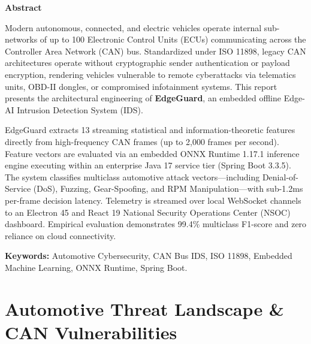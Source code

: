 \documentclass[12pt,a4paper]{report}
\begin{document}
\begin{center}
    {\Large \textbf{Abstract}}
\end{center}
\vspace{0.5cm}

Modern autonomous, connected, and electric vehicles operate internal sub-networks of up to 100 Electronic Control Units (ECUs) communicating across the Controller Area Network (CAN) bus. Standardized under ISO 11898, legacy CAN architectures operate without cryptographic sender authentication or payload encryption, rendering vehicles vulnerable to remote cyberattacks via telematics units, OBD-II dongles, or compromised infotainment systems. This report presents the architectural engineering of \textbf{EdgeGuard}, an embedded offline Edge-AI Intrusion Detection System (IDS).

EdgeGuard extracts 13 streaming statistical and information-theoretic features directly from high-frequency CAN frames (up to 2,000 frames per second). Feature vectors are evaluated via an embedded ONNX Runtime 1.17.1 inference engine executing within an enterprise Java 17 service tier (Spring Boot 3.3.5). The system classifies multiclass automotive attack vectors---including Denial-of-Service (DoS), Fuzzing, Gear-Spoofing, and RPM Manipulation---with sub-1.2ms per-frame decision latency. Telemetry is streamed over local WebSocket channels to an Electron 45 and React 19 National Security Operations Center (NSOC) dashboard. Empirical evaluation demonstrates 99.4\% multiclass F1-score and zero reliance on cloud connectivity.

\vspace{0.8cm}
\noindent \textbf{Keywords:} Automotive Cybersecurity, CAN Bus IDS, ISO 11898, Embedded Machine Learning, ONNX Runtime, Spring Boot.

\cleardoublepage
\tableofcontents

\cleardoublepage
{}
\setcounter{page}{1}

\chapter{Automotive Threat Landscape \& CAN Vulnerabilities}
\end{document}
